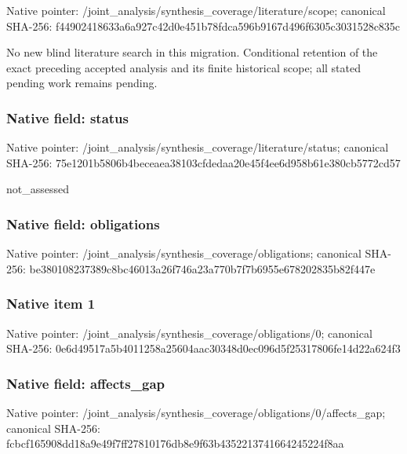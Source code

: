 \documentclass[10pt,a4paper]{article}
\begin{document}
Native pointer: /joint\_analysis/synthesi\allowbreak{}s\_coverage/literature/sc\allowbreak{}ope; canonical SHA-256: f44902418633a6a927c42d0e\allowbreak{}451b78fdca596b9167d496f6\allowbreak{}305c3031528c835c


No new blind literature search in this migration. Conditional retention of the exact preceding accepted analysis and its finite historical scope; all stated pending work remains pending.


\subsubsection{Native field: status}


Native pointer: /joint\_analysis/synthesi\allowbreak{}s\_coverage/literature/st\allowbreak{}atus; canonical SHA-256: 75e1201b5806b4beceaea381\allowbreak{}03cfdedaa20e45f4ee6d958b\allowbreak{}61e380cb5772cd57


not\_assessed


\subsubsection{Native field: obligations}


Native pointer: /joint\_analysis/synthesi\allowbreak{}s\_coverage/obligations; canonical SHA-256: be380108237389c8bc46013a\allowbreak{}26f746a23a770b7f7b6955e6\allowbreak{}78202835b82f447e



\subsubsection{Native item 1}


Native pointer: /joint\_analysis/synthesi\allowbreak{}s\_coverage/obligations/0; canonical SHA-256: 0e6d49517a5b4011258a2560\allowbreak{}4aac30348d0ec096d5f25317\allowbreak{}806fe14d22a624f3



\subsubsection{Native field: affects\_gap}


Native pointer: /joint\_analysis/synthesi\allowbreak{}s\_coverage/obligations/0\allowbreak{}/affects\_gap; canonical SHA-256: fcbcf165908dd18a9e49f7ff\allowbreak{}27810176db8e9f63b4352213\allowbreak{}741664245224f8aa
\end{document}
